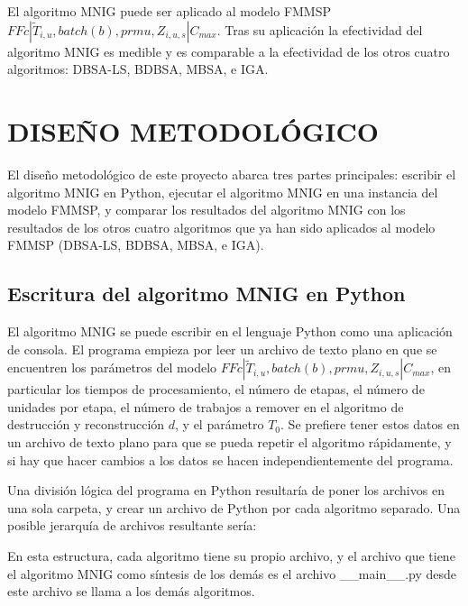 \documentclass{article}
\def\notac_modelo{$FFc | \tilde{T}_{i, u}, batch(b), prmu, Z_{i, u, s} | C_{max}$}
\begin{document}
El algoritmo MNIG puede ser aplicado al modelo FMMSP \linebreak \notac_modelo. Tras su aplicación la efectividad del algoritmo MNIG es medible y es comparable a la efectividad de los otros cuatro algoritmos: DBSA-LS, BDBSA, MBSA, e IGA.

\section{DISEÑO METODOLÓGICO}

El diseño metodológico de este proyecto abarca tres partes principales: escribir el algoritmo MNIG en Python, ejecutar el algoritmo MNIG en una instancia del modelo FMMSP, y comparar los resultados del algoritmo MNIG con los resultados de los otros cuatro algoritmos que ya han sido aplicados al modelo FMMSP (DBSA-LS, BDBSA, MBSA, e IGA).

\subsection{Escritura del algoritmo MNIG en Python}

El algoritmo MNIG se puede escribir en el lenguaje Python como una aplicación de consola. El programa empieza por leer un archivo de texto plano en que se encuentren los parámetros del modelo \notac_modelo, en particular los tiempos de procesamiento, el número de etapas, el número de unidades por etapa, el número de trabajos a remover en el algoritmo de destrucción y reconstrucción $d$, y el parámetro $T_{0}$. Se prefiere tener estos datos en un archivo de texto plano para que se pueda repetir el algoritmo rápidamente, y si hay que hacer cambios a los datos se hacen independientemente del programa.

\vspace{\baselineskip}
Una división lógica del programa en Python resultaría de poner los archivos en una sola carpeta, y crear un archivo de Python por cada algoritmo separado. Una posible jerarquía de archivos resultante sería:

\vspace{\baselineskip}

\vspace{\baselineskip}
En esta estructura, cada algoritmo tiene su propio archivo, y el archivo que tiene el algoritmo MNIG como síntesis de los demás es el archivo \_\_main\_\_.py desde este archivo se llama a los demás algoritmos.
\end{document}
